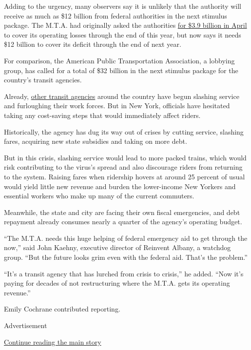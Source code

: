 Adding to the urgency, many observers say it is unlikely that the
authority will receive as much as \$12 billion from federal authorities
in the next stimulus package. The M.T.A. had originally asked the
authorities
\href{https://www.nytimes3xbfgragh.onion/2020/03/17/nyregion/coronavirus-nyc-subway-federal-aid-.html}{for
\$3.9 billion in April} to cover its operating losses through the end of
this year, but now says it needs \$12 billion to cover its deficit
through the end of next year.

For comparison, the American Public Transportation Association, a
lobbying group, has called for a total of \$32 billion in the next
stimulus package for the country's transit agencies.

Already,
\href{https://www.nytimes3xbfgragh.onion/2020/07/19/us/coronavirus-public-transit.html}{other
transit agencies} around the country have begun slashing service and
furloughing their work forces. But in New York, officials have hesitated
taking any cost-saving steps that would immediately affect riders.

Historically, the agency has dug its way out of crises by cutting
service, slashing fares, acquiring new state subsidies and taking on
more debt.

But in this crisis, slashing service would lead to more packed trains,
which would risk contributing to the virus's spread and also discourage
riders from returning to the system. Raising fares when ridership hovers
at around 25 percent of usual would yield little new revenue and burden
the lower-income New Yorkers and essential workers who make up many of
the current commuters.

Meanwhile, the state and city are facing their own fiscal emergencies,
and debt repayment already consumes nearly a quarter of the agency's
operating budget.

``The M.T.A. needs this huge helping of federal emergency aid to get
through the now,'' said John Kaehny, executive director of Reinvent
Albany, a watchdog group. ``But the future looks grim even with the
federal aid. That's the problem.''

``It's a transit agency that has lurched from crisis to crisis,'' he
added. ``Now it's paying for decades of not restructuring where the
M.T.A. gets its operating revenue.''

Emily Cochrane contributed reporting.

Advertisement

\protect\hyperlink{after-bottom}{Continue reading the main story}

